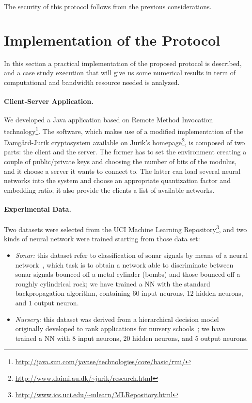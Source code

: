 \documentclass[11pt,oribibl,runningheads]{llncs}
\begin{document}
The security of this protocol follows from the previous
considerations.


\section{Implementation of the Protocol}
\label{sec:exp}

In this section a practical implementation of the proposed protocol
is described, and a case study execution that will give us some
numerical results in term of computational and bandwidth resource
needed is analyzed.

\paragraph{Client-Server Application.}
We developed a Java application based on Remote Method Invocation technology\footnote{\url{http://java.sun.com/javase/technologies/core/basic/rmi/}}. The software, which makes use of a modified implementation of the Damg{\aa}rd-Jurik cryptosystem available on Jurik's homepage\footnote{\url{http://www.daimi.au.dk/~jurik/research.html}}, is composed of two parts: the client and the server. The former has to set the environment creating a couple of public/private keys and choosing the number of bits of the modulus, and it choose a server it wants to connect to. The latter can load several neural networks into the system and choose an appropriate quantization factor and embedding ratio; it also provide the clients a list of available networks.

\paragraph{Experimental Data.}
Two datasets were selected from the UCI Machine Learning
Repository\footnote{\url{http://www.ics.uci.edu/~mlearn/MLRepository.html}},
and two kinds of neural network were trained starting from
those data set:
\begin{itemize}
 \item {\em Sonar:} this dataset refer to classification of sonar signals by means of a neural network~\cite{rajkovic1997}, which task is to obtain a network able to discriminate between sonar signals bounced off a metal cylinder (bombs) and those bounced off a roughly cylindrical rock; we have trained a NN with the standard backpropagation algorithm, containing $60$ input neurons, $12$ hidden neurons, and $1$ output neuron.
 \item {\em Nursery:} this dataset was derived from a hierarchical decision model originally developed to rank applications for nursery schools~\cite{gorman1988}; we have trained a NN with $8$ input neurons, $20$ hidden neurons, and $5$ output neurons.
\end{itemize}
\end{document}
